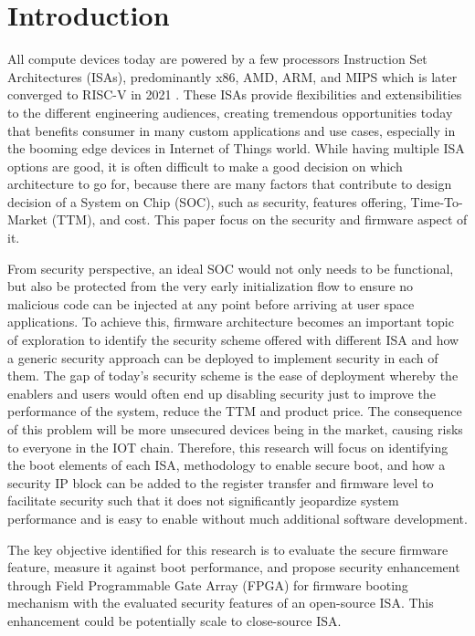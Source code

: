 \documentclass[review]{elsarticle}
\begin{document}
\section{Introduction}

All compute devices today are powered by a few processors Instruction Set Architectures
(ISAs), predominantly x86, AMD, ARM, and MIPS which is later converged to RISC-V in
2021 \cite{R5:1}. These ISAs provide flexibilities and extensibilities to the
different engineering audiences, creating tremendous opportunities today that benefits
consumer in many custom applications and use cases, especially in the booming edge devices
in Internet of Things world. While having multiple ISA options are good, it is often difficult to
make a good decision on which architecture to go for, because there are many factors that
contribute to design decision of a System on Chip (SOC), such as security, features offering,
Time-To-Market (TTM), and cost. This paper focus on the security and firmware aspect of it.

From security perspective, an ideal SOC would not only needs to be functional, but also be protected
from the very early initialization flow to ensure no malicious code can be injected at any point before arriving at
user space applications. To achieve this, firmware architecture becomes an important topic
of exploration to identify the security scheme offered with different ISA and how a generic
security approach can be deployed to implement security in each of them. The gap of today’s
security scheme is the ease of deployment whereby the enablers and users would often end up
disabling security just to improve the performance of the system, reduce the TTM and product price.
The consequence of this problem will be more unsecured devices being in the market,
causing risks to everyone in the IOT chain. Therefore, this research will focus on identifying the
boot elements of each ISA, methodology to enable secure boot, and how a security IP block
can be added to the register transfer and firmware level to facilitate security such that it
does not significantly jeopardize system performance and is easy to enable without much
additional software development.

The key objective identified for this research is to
evaluate the secure firmware feature, measure it against boot performance, and propose
security enhancement through Field Programmable Gate Array (FPGA) for firmware booting
mechanism with the evaluated security features of an open-source ISA. This enhancement
could be potentially scale to close-source ISA.
\end{document}
